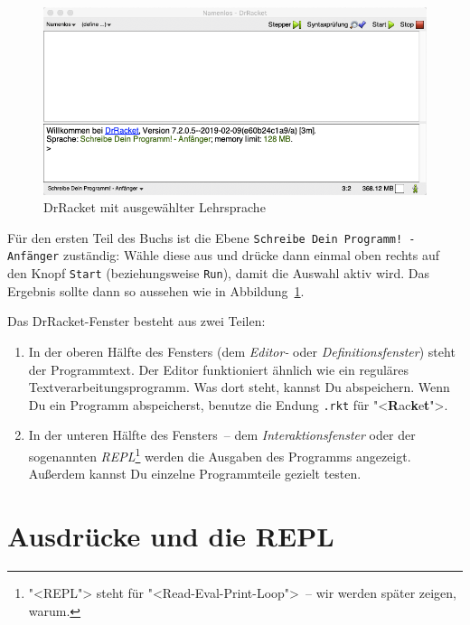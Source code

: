 \begin{figure}[tb]
  \centering
  \includegraphics[width=\textwidth]{elemente/drracket-deinprogramm}
  \caption{DrRacket mit ausgewählter Lehrsprache}
  \label{fig:drracket-deinprogramm}
\end{figure}

Für den ersten Teil des Buchs ist die Ebene \texttt{Schreibe Dein
  Programm! - Anfänger} zuständig: Wähle
diese aus und drücke dann einmal oben rechts auf den Knopf
\texttt{Start} (beziehungsweise \texttt{Run}), damit die Auswahl aktiv wird.
Das Ergebnis sollte dann so aussehen wie in
Abbildung~\ref{fig:drracket-deinprogramm}.

Das DrRacket-Fenster besteht aus zwei Teilen:
%
\begin{enumerate}
\item In der oberen Hälfte des Fensters (dem
  \textit{Editor-} oder
  \textit{Definitionsfenster}) steht der
  Programmtext.  Der Editor funktioniert ähnlich wie ein reguläres
  Textverarbeitungsprogramm.  Was dort steht, kannst Du abspeichern.
  Wenn Du ein Programm abspeicherst, benutze die Endung \texttt{.rkt}
  für "<\textbf{R}ac\textbf{k}e\textbf{t}">.
\item In der unteren Hälfte des Fensters~-- dem
  \textit{Interaktionsfenster} oder der
  sogenannten \textit{REPL}\footnote{"<REPL"> steht für
    "<Read-Eval-Print-Loop">~-- wir werden später zeigen, warum.}
  werden die Ausgaben des Programms angezeigt.  Außerdem kannst Du
  einzelne Programmteile gezielt testen.
\end{enumerate}
%

\section{Ausdrücke und die REPL}

